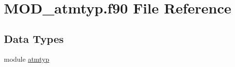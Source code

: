 \hypertarget{MOD__atmtyp_8f90}{\section{M\-O\-D\-\_\-atmtyp.\-f90 File Reference}
\label{MOD__atmtyp_8f90}
}
\subsection*{Data Types}
\begin{DoxyCompactItemize}
\item 
module \hyperlink{classatmtyp}{atmtyp}
\end{DoxyCompactItemize}
